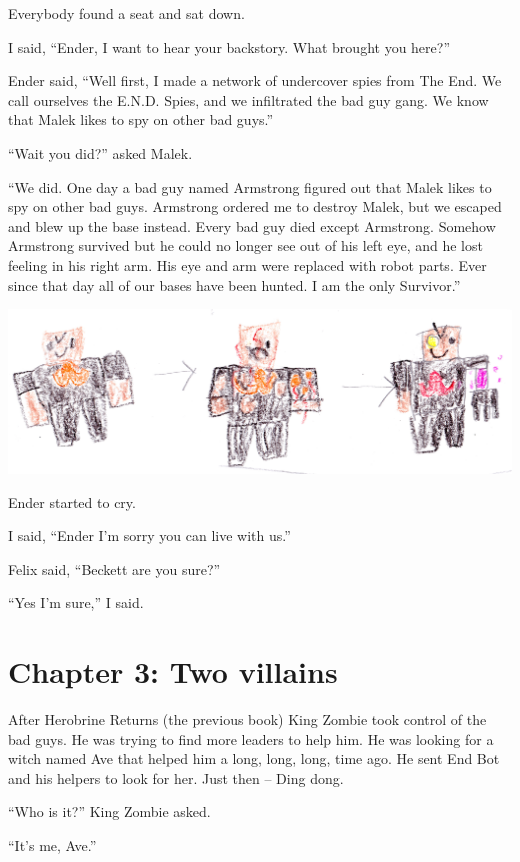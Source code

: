 \documentclass[12pt,oneside]{krantz}
\begin{document}
Everybody found a seat and sat down.

I said, ``Ender, I want to hear your backstory. What brought you here?''

Ender said, ``Well first, I made a network of undercover spies from The
End. We call ourselves the E.N.D. Spies, and we infiltrated the bad guy
gang. We know that Malek likes to spy on other bad guys.''

``Wait you did?'' asked Malek.

``We did. One day a bad guy named Armstrong figured out that Malek likes
to spy on other bad guys. Armstrong ordered me to destroy Malek, but we
escaped and blew up the base instead. Every bad guy died except
Armstrong. Somehow Armstrong survived but he could no longer see out of
his left eye, and he lost feeling in his right arm. His eye and arm were
replaced with robot parts. Ever since that day all of our bases have
been hunted. I am the only Survivor.''

\includegraphics[width=6.25in,height=\textheight]{img/armstrong.jpg}

Ender started to cry.

I said, ``Ender I'm sorry you can live with us.''

Felix said, ``Beckett are you sure?''

``Yes I'm sure,'' I said.

\hypertarget{chapter-3-two-villains}{%
\chapter*{Chapter 3: Two villains}\label{chapter-3-two-villains}}


After Herobrine Returns (the previous book) King Zombie took control of
the bad guys. He was trying to find more leaders to help him. He was
looking for a witch named Ave that helped him a long, long, long, time
ago. He sent End Bot and his helpers to look for her. Just then -- Ding
dong.

``Who is it?'' King Zombie asked.

``It's me, Ave.''
\end{document}
